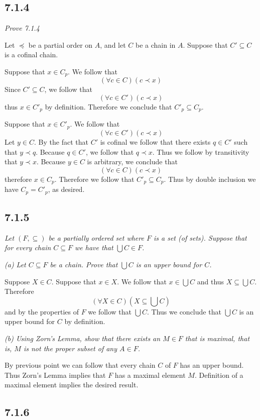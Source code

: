 \documentclass[11pt,oneside,titlepage]{book}
\begin{document}
\subsection*{7.1.4}

\textit{Prove 7.1.4}

Let $\preceq$ be a partial order on $A$, and let $C$ be a chain in $A$. Suppose that
$C' \subseteq C$ is a cofinal chain.

Suppose that $x \in C_p$. We follow that
$$(\forall c \in C)(c \prec x)$$
Since $C' \subseteq C$, we follow that
$$(\forall c \in C')(c \prec x)$$
thus $x \in C'_p$ by definition. Therefore we conclude that  $C'_p \subseteq C_p$.

Suppose that $x \in C'_p$. We follow that
$$(\forall c \in C')(c \prec x)$$
Let $y \in C$. By the fact that $C'$ is cofinal we follow that there exists $q \in C'$ such that
$y \prec q$. Because $q \in C'$, we follow that $q \prec x$. Thus we follow by transitivity
that $y \prec x$. Because $y \in C$ is arbitrary, we conclude that
$$(\forall c \in C)(c \prec x)$$
therefore $x \in C_p$. Therefore we follow that $C'_p \subseteq C_p$. Thus by double
inclusion we have $C_p = C'_p$, as desired.

\subsection*{7.1.5}

\textit{Let $(F, \subseteq)$ be a partially ordered set where $F$ is a set (of sets).
  Suppose that for every chain $C \subseteq F$ we have that $\bigcup{C} \in F$. 
}

\textit{(a) Let $C \subseteq F$ be a chain.
  Prove that $\bigcup{C}$ is an upper bound for $C$.}

Suppose $X \in C$. Suppose that $x \in X$. We follow that $x \in \bigcup{C}$ and
thus $X \subseteq \bigcup{C}$. Therefore
$$(\forall X \in C)(X \subseteq \bigcup{C})$$
and by the properties of $F$ we follow that $\bigcup{C}$. Thus we conclude that $\bigcup{C}$
is an upper bound for $C$ by definition.

\textit{(b) Using Zorn's Lemma, show that there exists an $M \in F$ that is
  maximal, that is, $M$ is not the proper subset of any $A \in F$.}

By previous point we can follow that every chain $C$ of $F$ has an upper bound. Thus
Zorn's Lemma implies that $F$ has a maximal element $M$. Definition of a maximal
element implies the desired result.

\subsection*{7.1.6}
\end{document}
